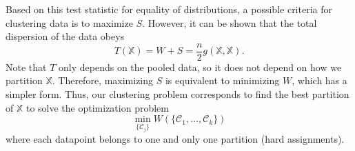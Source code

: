 \documentclass{article}
\newcommand\C{{\mathcal{C}}}
\begin{document}
Based on this test statistic for equality of distributions, a possible
criteria for clustering data is to 
maximize $S$. However, 
it can be shown that the total dispersion of the data obeys \cite{Szkely2013}
\begin{equation}
T(\mathbb{X}) 
= W + S = \dfrac{n}{2}
g(\mathbb{X}, \mathbb{X}). 
\end{equation}
Note that $T$ only depends on the pooled data, so it 
does not depend on how we partition $\mathbb{X}$. Therefore, maximizing
$S$ is equivalent to minimizing $W$, which
has a simpler form. Thus, our clustering problem corresponds to
find the best partition of $\mathbb{X}$ to solve the optimization problem
\begin{equation}
\label{eq:minimize}
\min_{\{ \C_j \} } W(\{ 
\C_1, \dotsc, \C_k
\})
\end{equation}
where each datapoint belongs to one and only one partition (hard assignments).
\end{document}
